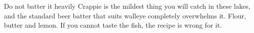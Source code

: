 \begin{telospanel}{Do not batter it heavily}
Crappie is the mildest thing you will catch in these lakes, and the standard beer batter that suits walleye completely overwhelms it. Flour, butter and lemon. If you cannot taste the fish, the recipe is wrong for it.
\end{telospanel}



\advisorypanfish

